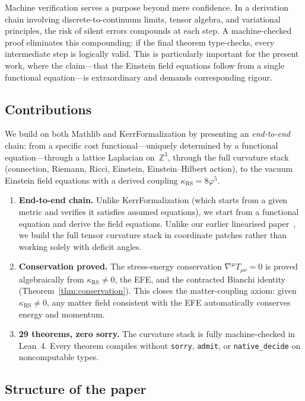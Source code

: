 \documentclass[11pt,a4paper]{article}
\newcommand{\vp}{\varphi}
\newcommand{\kRS}{\kappa_{\mathrm{RS}}}
\newcommand{\ZZ}{\mathbb{Z}}
\begin{document}
Machine verification serves a purpose beyond mere confidence.
In a derivation chain involving discrete-to-continuum limits, tensor algebra, and variational principles, the risk of silent errors compounds at each step.
A machine-checked proof eliminates this compounding: if the final theorem type-checks, every intermediate step is logically valid.
This is particularly important for the present work, where the claim---that the Einstein field equations follow from a single functional equation---is extraordinary and demands corresponding rigour.

\subsection{Contributions}

We build on both Mathlib and KerrFormalization by presenting an \emph{end-to-end} chain: from a specific cost functional---uniquely determined by a functional equation---through a lattice Laplacian on~$\ZZ^3$, through the full curvature stack (connection, Riemann, Ricci, Einstein, Einstein--Hilbert action), to the vacuum Einstein field equations with a derived coupling $\kRS = 8\vp^5$.

\begin{enumerate}[leftmargin=*]
\item \textbf{End-to-end chain.}  Unlike KerrFormalization (which starts from a given metric and verifies it satisfies assumed equations), we start from a functional equation and derive the field equations.
Unlike our earlier linearised paper~\cite{Washburn2026linear}, we build the full tensor curvature stack in coordinate patches rather than working solely with deficit angles.

\item \textbf{Conservation proved.}  The stress-energy conservation $\nabla^\mu T_{\mu\nu} = 0$ is proved algebraically from $\kRS \neq 0$, the EFE, and the contracted Bianchi identity (Theorem~\ref{thm:conservation}).
This closes the matter-coupling axiom: given $\kRS \ne 0$, any matter field consistent with the EFE automatically conserves energy and momentum.

\item \textbf{29 theorems, zero sorry.}  The curvature stack is fully machine-checked in Lean~4.
Every theorem compiles without \texttt{sorry}, \texttt{admit}, or \texttt{native\_decide} on noncomputable types.
\end{enumerate}

\subsection{Structure of the paper}
\end{document}
